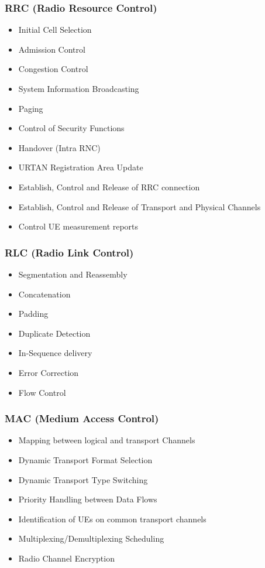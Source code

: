 \begin{minipage}{0.4\linewidth}
\subsubsection{RRC (Radio Resource Control)}
\begin{itemize}
\item Initial Cell Selection
\item Admission Control
\item Congestion Control
\item System Information Broadcasting
\item Paging
\item Control of Security Functions
\item Handover (Intra RNC)
\item URTAN Registration Area Update
\item Establish, Control and Release of RRC connection
\item Establish, Control and Release of Transport and Physical Channels
\item Control UE measurement reports
\end{itemize}
\end{minipage}
\begin{minipage}{0.25\linewidth}
\subsubsection{RLC (Radio Link Control)}
\begin{itemize}
\item Segmentation and Reassembly 
\item Concatenation
\item Padding
\item Duplicate Detection
\item In-Sequence delivery
\item Error Correction
\item Flow Control
\end{itemize}
\end{minipage}
\begin{minipage}{0.35\linewidth}
\subsubsection{MAC (Medium Access Control)}
\begin{itemize}
\item Mapping between logical and transport Channels
\item Dynamic Transport Format Selection
\item Dynamic Transport Type Switching
\item Priority Handling between Data Flows
\item Identification of UEs on common transport channels
\item Multiplexing/Demultiplexing Scheduling
\item Radio Channel Encryption
\end{itemize}
\end{minipage}

